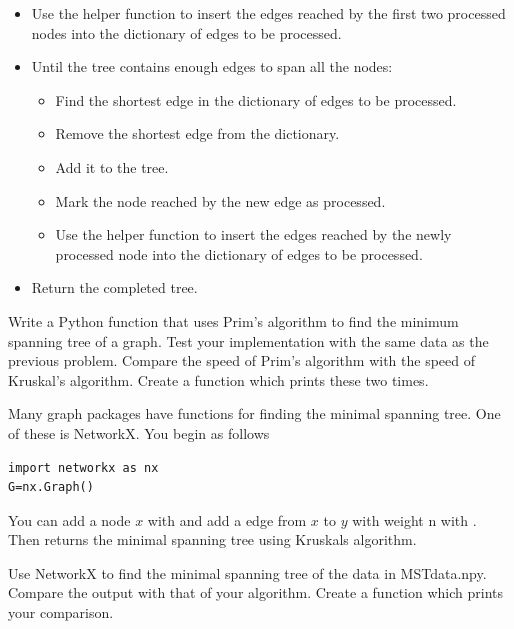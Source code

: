 \begin{itemize}
\begin{itemize}
	\end{itemize}

\item Use the helper function to insert the edges reached by the first two processed nodes into the dictionary of edges to be processed.

\item Until the tree contains enough edges to span all the nodes:

	\begin{itemize}

	\item Find the shortest edge in the dictionary of edges to be processed.

	\item Remove the shortest edge from the dictionary.

	\item Add it to the tree.

	\item Mark the node reached by the new edge as processed.

	\item Use the helper function to insert the edges reached by the newly processed node into the dictionary of edges to be processed.

	\end{itemize}

\item Return the completed tree.

\end{itemize}

\begin{problem}
Write a Python function that uses Prim's algorithm to find the minimum spanning tree of a graph.
Test your implementation with the same data as the previous problem.
Compare the speed of Prim's algorithm with the speed of Kruskal's algorithm.
Create a function which prints these two times.
\end{problem}

Many graph packages have functions for finding the minimal spanning tree. One of these is NetworkX. You begin as follows
\begin{lstlisting}
import networkx as nx
G=nx.Graph()
\end{lstlisting}
You can add a node $x$ with  and add a edge from $x$ to $y$ with weight n with . Then  returns the minimal spanning tree using Kruskals algorithm.

\begin{problem}
Use NetworkX to find the minimal spanning tree of the data in MSTdata.npy.
Compare the output with that of your algorithm.
Create a function which prints your comparison.
\end{problem}

